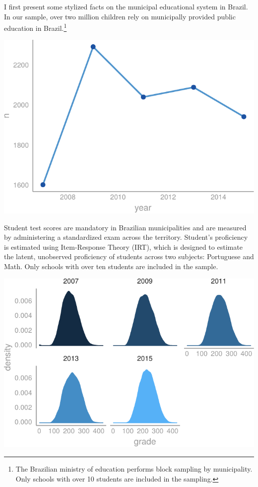 \documentclass[12pt,]{article}
\let\rmarkdownfootnote\footnote%
\def\footnote{\protect\rmarkdownfootnote}
\begin{document}
I first present some stylized facts on the municipal educational system
in Brazil. In our sample, over two million children rely on municipally
provided public education in Brazil.\footnote{The Brazilian ministry of
  education performs block sampling by municipality. Only schools with
  over 10 students are included in the sampling.}

\begin{center}\includegraphics{dissertation_files/figure-latex/unnamed-chunk-31-1} \end{center}

Student test scores are mandatory in Brazilian municipalities and are
measured by administering a standardized exam across the territory.
Student's proficiency is estimated using Item-Response Theory (IRT),
which is designed to estimate the latent, unobserved proficiency of
students across two subjects: Portuguese and Math. Only schools with
over ten students are included in the sample.

\begin{center}\includegraphics{dissertation_files/figure-latex/unnamed-chunk-32-1} \end{center}
\end{document}
